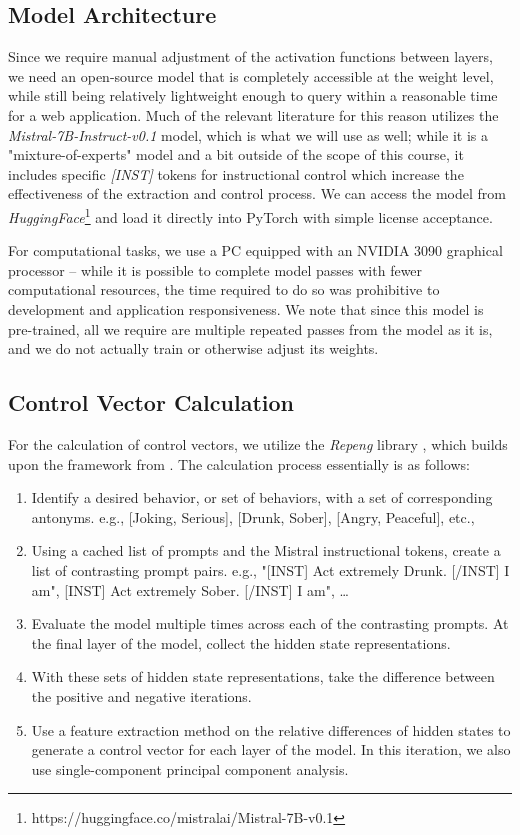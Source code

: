 \documentclass[11pt,a4paper]{article}
\begin{document}
\subsection{Model Architecture}
Since we require manual adjustment of the activation functions between layers, we need an open-source model that is completely accessible at the weight level, while still being relatively lightweight enough to query within a reasonable time for a web application. Much of the relevant literature for this reason utilizes the \emph{Mistral-7B-Instruct-v0.1} \cite{jiang2023mistral} model, which is what we will use as well; while it is a "mixture-of-experts" model and a bit outside of the scope of this course, it includes specific \emph{[INST]} tokens for instructional control which increase the effectiveness of the extraction and control process. We can access the model from \emph{HuggingFace}\footnote{https://huggingface.co/mistralai/Mistral-7B-v0.1} and load it directly into PyTorch with simple license acceptance.

For computational tasks, we use a PC equipped with an NVIDIA 3090 graphical processor -- while it is possible to complete model passes with fewer computational resources, the time required to do so was prohibitive to development and application responsiveness. We note that since this model is pre-trained, all we require are multiple repeated passes from the model as it is, and we do not actually train or otherwise adjust its weights.

\subsection{Control Vector Calculation}
For the calculation of control vectors, we utilize the \emph{Repeng} library \cite{vogel2024repeng}, which builds upon the framework from \cite{zou2023representation}. The calculation process essentially is as follows:
\begin{enumerate}
    \item Identify a desired behavior, or set of behaviors, with a set of corresponding antonyms. e.g., [Joking, Serious], [Drunk, Sober], [Angry, Peaceful], etc.,
    \item Using a cached list of prompts and the Mistral instructional tokens, create a list of contrasting prompt pairs. e.g., "[INST] Act extremely Drunk. [/INST] I am", [INST] Act extremely Sober. [/INST] I am", \dots 
    \item Evaluate the model multiple times across each of the contrasting prompts. At the final layer of the model, collect the hidden state representations. 
    \item With these sets of hidden state representations, take the difference between the positive and negative iterations.
    \item Use a feature extraction method on the relative differences of hidden states to generate a control vector for each layer of the model. In this iteration, we also use single-component principal component analysis.
\end{enumerate}
\end{document}
